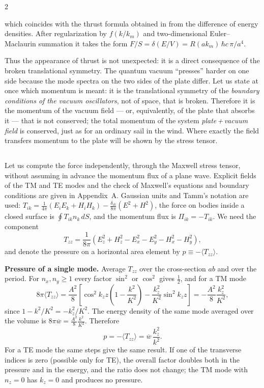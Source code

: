 \documentclass[twoside, 10pt]{article}
\def\myvspacebeforesubsection{-2.0mm}
\def\myvspaceaftersubsection{-2.5mm}
\begin{document}
\begin{multicols}{2}

which coincides with the thrust formula obtained in \cite{Drozdov2024} from the difference of energy
densities. After regularization by \(f(k/k_m)\) and two-dimensional Euler--Maclaurin summation it
takes the form \(F/S=\delta(E/V)=R(ak_m)\,\hbar c\,\pi/a^4\).

Thus the appearance of thrust is not unexpected: it is a direct consequence of the broken
translational symmetry. The quantum vacuum ``presses'' harder on one side because the mode spectra
on the two sides of the plate differ. Let us state at once which momentum is meant: it is the
translational symmetry of the \emph{boundary conditions of the vacuum oscillators}, not of space, that is broken. Therefore it is the momentum of the vacuum field --- or, equivalently, of the plate that absorbs it --- that is not conserved; the total momentum of the system \emph{plate\,+\,vacuum field} is conserved, just as
for an ordinary sail in the wind. Where exactly the field transfers momentum to the plate will be
shown by the stress tensor.

\vspace{\myvspacebeforesubsection}
\subsection*{}
\vspace{\myvspaceaftersubsection}


Let us compute the force independently, through the Maxwell stress tensor, without assuming in
advance the momentum flux of a plane wave. Explicit fields of the TM and TE modes and the check of
Maxwell's equations and boundary conditions are given in Appendix~A. Gaussian units and Tamm's
notation \cite{Tamm1957} are used:
\(T_{ik}=\frac1{4\pi}(E_iE_k+H_iH_k)-\frac{\delta_{ik}}{8\pi}(E^2+H^2)\), the force on bodies
inside a closed surface is \(\oint T_{ik}n_k\,dS\), and the momentum flux is \(\Pi_{ik}=-T_{ik}\).
We need the component
\[
T_{zz}=\frac1{8\pi}\left(E_z^2+H_z^2-E_x^2-E_y^2-H_x^2-H_y^2\right),
\]
and denote the pressure on a horizontal area element by \(p\equiv-\langle T_{zz}\rangle\).

\textbf{Pressure of a single mode.} Average \(T_{zz}\) over the cross-section \(ab\) and over the
period. For \(n_x,n_y\ge1\) every factor \(\sin^2\) or \(\cos^2\) gives \(\tfrac12\), and for a TM
mode
\[
8\pi\langle T_{zz}\rangle=\frac{A^2}{8}\left[\cos^2k_zz\left(1-\frac{k^2}{K^2}\right)-\frac{k_z^2}{K^2}\sin^2k_zz\right]
=-\frac{A^2}{8}\frac{k_z^2}{K^2},
\]
since \(1-k^2/K^2=-k_z^2/K^2\). The energy density of the same mode averaged over the volume is
\(8\pi\overline w=\frac{A^2}{8}\frac{k^2}{K^2}\). Therefore
\[
p=-\langle T_{zz}\rangle=\overline w\,\frac{k_z^2}{k^2}.
\]
For a TE mode the same steps give the same result. If one of the transverse indices is zero
(possible only for TE), the overall factor doubles both in the pressure and in the energy, and the
ratio does not change; the TM mode with \(n_z=0\) has \(k_z=0\) and produces no pressure.


\end{multicols}
\end{document}
